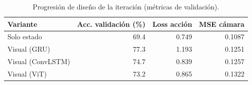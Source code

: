 \begin{table}[hp!]
  \centering
  \small
  \begin{tabular}{l|r|r|r}
  \rowcolor{udcpink!25}
  \textbf{Variante} & \textbf{Acc. validación (\%)} & \textbf{Loss acción} & \textbf{MSE cámara} \\\hline
  Solo estado & 69.4 & 0.749 & 0.1087 \\
  Visual (GRU) & 77.3 & 1.193 & 0.1251 \\
  Visual (ConvLSTM) & 74.7 & 0.839 & 0.1257 \\
  Visual (ViT) & 73.2 & 0.865 & 0.1322 \\
  \end{tabular}
  \caption{Progresión de diseño de la iteración (métricas de validación).}
  \label{tab:progresion-il}
\end{table}

